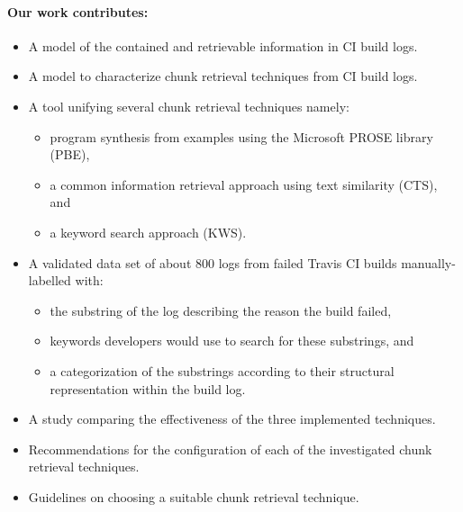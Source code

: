 \documentclass[\myrootdir/main.tex]{subfiles}
\begin{document}
\paragraph{Our work contributes:}
\begin{itemize}
  \item A model of the contained and retrievable information in CI build logs.
  \item A model to characterize chunk retrieval techniques from CI build logs.
  \item A tool unifying several chunk retrieval techniques namely:
        \begin{itemize}
          \item program synthesis from examples using the Microsoft PROSE library (PBE),
          \item a common information retrieval approach using text similarity (CTS), and
          \item a keyword search approach (KWS).
        \end{itemize}
  \item A validated data set of about 800 logs from failed Travis CI builds manually-labelled with:
        \begin{itemize}
          \item the substring of the log describing the reason the build failed,
          \item keywords developers would use to search for these substrings, and
          \item a categorization of the substrings according to their structural representation within the build log.
        \end{itemize}
  \item A study comparing the effectiveness of the three implemented techniques.
  \item Recommendations for the configuration of each of the investigated chunk retrieval techniques.
  \item Guidelines on choosing a suitable chunk retrieval technique.
\end{itemize}
\end{document}
